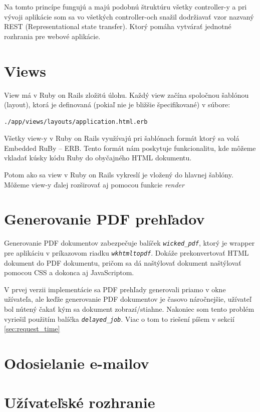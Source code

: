 Na tomto princípe fungujú a majú podobnú štruktúru všetky controller-y a pri vývoji aplikácie som sa vo všetkých controller-och snažil dodržiavať vzor nazvaný REST (Representational state transfer). Ktorý pomáha vytvárať jednotné rozhrania pre webové aplikácie.

\section{Views}

View má v Ruby on Rails zložitú úlohu. Každý view začína spoločnou šablónou (layout), ktorá je definovaná (pokiaľ nie je bližšie špecifikované) v súbore:

\begin{verbatim}
./app/views/layouts/application.html.erb
\end{verbatim}

Všetky view-y v Ruby on Rails využívajú pri šablónach formát ktorý sa volá Embedded RuBy -- ERB. Tento formát nám poskytuje funkcionalitu, kde môžeme vkladať kúsky kódu Ruby do obyčajného HTML dokumentu.

Potom ako sa view v Ruby on Rails vykreslí je vložený do hlavnej šablóny. Môžeme view-y ďalej rozširovať aj pomocou funkcie \emph{render}

\section{Generovanie PDF prehľadov}

Generovanie PDF dokumentov zabezpečuje balíček \emph{\texttt{wicked\_pdf}}, ktorý je wrapper pre aplikáciu v príkazovom riadku \emph{\texttt{wkhtmltopdf}}. Dokáže prekonvertovať HTML dokument do PDF dokumentu, pričom sa dá naštýlovať dokument naštýlovať pomocou CSS a dokonca aj JavaScriptom. 

V prvej verzii implementácie sa PDF prehľady generovali priamo v okne užívateľa, ale keďže generovanie PDF dokumentov je časovo náročnejšie, užívateľ bol nútený čakať kým sa dokument zobrazí/stiahne. Nakoniec som tento problém vyriešil použitím balíčka \emph{\texttt{delayed\_job}}. Viac o tom to riešení píšem v sekcií \ref{sec:request_time}

\section{Odosielanie e-mailov}

\clearpage
\section{Užívateľské rozhranie}

